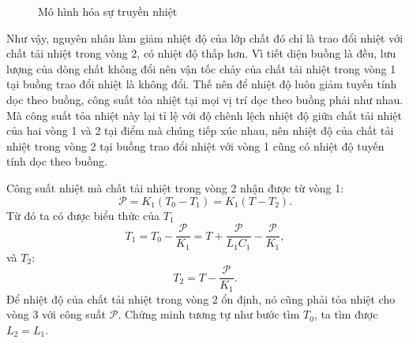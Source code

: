 \begin{enumerate}
\begin{figure}[!h]
{\begin{tikzpicture}[x=0.75pt,y=0.75pt,yscale=-1,xscale=1]
\end{tikzpicture}}
        \caption{Mô hình hóa sự truyền nhiệt}
        \label{fig:99}
    \end{figure}

    Như vậy, nguyên nhân làm giảm nhiệt độ của lớp chất đó chỉ là trao đổi nhiệt với chất tải nhiệt trong vòng 2, có nhiệt độ thấp hơn. Vì tiết diện buồng là đều, lưu lượng của dòng chất không đổi nên vận tốc chảy của chất tải nhiệt trong vòng 1 tại buồng trao đổi nhiệt là không đổi. Thế nên để nhiệt độ luôn giảm tuyến tính dọc theo buồng, công suất tỏa nhiệt tại mọi vị trí dọc theo buồng phải như nhau. Mà công suất tỏa nhiệt này lại tỉ lệ với độ chênh lệch nhiệt độ giữa chất tải nhiệt của hai vòng 1 và 2 tại điểm mà chúng tiếp xúc nhau, nên nhiệt độ của chất tải nhiệt trong vòng 2 tại buồng trao đổi nhiệt với vòng 1 cũng có nhiệt độ tuyến tính dọc theo buồng.

    Công suất nhiệt mà chất tải nhiệt trong vòng 2 nhận được từ vòng 1:
    \begin{equation}
        \mathcal{P}=K_1(T_0-T_1)=K_1(T-T_2).
    \end{equation}
    Từ đó ta có được biểu thức của $T_1$
    \begin{equation}
    \boxed{
            T_1=T_0-\dfrac{\mathcal{P}}{K_1}=T+\dfrac{\mathcal{P}}{L_1 C_1}-\dfrac{\mathcal{P}}{K_1},}
    \end{equation}
    và $T_2$:
    \begin{equation}
        \boxed{
        T_2=T-\dfrac{\mathcal{P}}{K_1}.
        }
    \end{equation}
    Để nhiệt độ của chất tải nhiệt trong vòng 2 ổn định, nó cũng phải tỏa nhiệt cho vòng 3 với công suất $\mathcal{P}$. Chứng minh tương tự như bước tìm $T_0$, ta tìm được $\boxed{L_2=L_1}$.


\end{enumerate}
